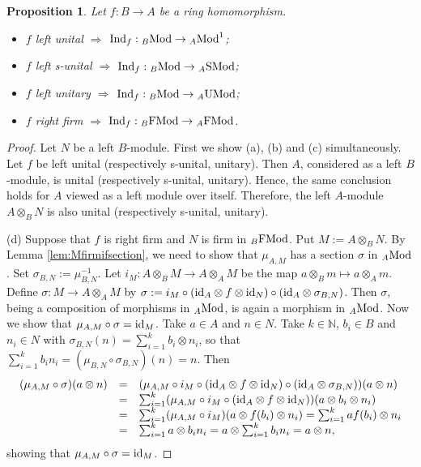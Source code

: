 \documentclass[12pt]{amsart}
\newtheorem{prop}[thm]{Proposition}
\theoremstyle{definition}
\newcommand{\N}{\mathbb{N}}
\newcommand{\Mod}{{\rm Mod}}
\newcommand{\FMod}{{\rm FMod}}
\newcommand{\SMod}{{\rm SMod}}
\newcommand{\UMod}{{\rm UMod}}
\newcommand{\id}{{\rm id}}
\newcommand{\Ind}{{\rm Ind}}
\begin{document}
\begin{prop}
Let $f : B \to A$ be a ring homomorphism. 

\begin{itemize}[widest=(a)]

\item[{\rm (a)}] $f$ left unital
$\Longrightarrow$
$\Ind_f : {}_B \Mod \to {}_A \Mod^1$;

\item[{\rm (b)}] $f$ left s-unital 
$\Longrightarrow$
$\Ind_f : {}_B \Mod \to {}_A \SMod$;

\item[{\rm (c)}] $f$ left unitary 
$\Longrightarrow$
$\Ind_f : {}_B \Mod \to {}_A \UMod$;

\item[{\rm (d)}] $f$ right firm 
$\Longrightarrow$
$\Ind_f : {}_B \FMod \to {}_A \FMod$.

\end{itemize}
\end{prop}

\begin{proof}
Let $N$ be a left $B$-module.
First we show (a), (b) and (c) 
simultaneously. Let $f$ be left
unital (respectively s-unital, unitary). 
Then $A$,
considered as a left $B$-module, is
unital (respectively s-unital, unitary).
Hence, the same conclusion holds for 
$A$ viewed as a left module over itself.
Therefore, the left $A$-module
$A \otimes_B N$ is also unital 
(respectively s-unital, unitary).

(d) Suppose that $f$ is right firm and $N$ 
is firm in ${}_B \FMod$. 
Put $M := A \otimes_B N$.
By Lemma \ref{lem:Mfirmifsection}, 
we need to show that $\mu_{A,M}$ 
has a section $\sigma$ in ${}_A \Mod$. 
Set $\sigma_{B,N} := \mu_{B,N}^{-1}$.
Let $i_M : A \otimes_B M \to A \otimes_A M$ be the 
map $a \otimes_B m \mapsto a \otimes_A m$.
Define $\sigma : M \to A \otimes_A M$ by
$\sigma := i_M \circ (\id_A \otimes f \otimes \id_N) \circ
(\id_A \otimes \sigma_{B,N})$.
Then $\sigma$, being a 
composition of morphisms in ${}_A \Mod$, is 
again a morphism in ${}_A \Mod$.
Now we show that
$\mu_{A,M} \circ \sigma = \id_M$.
Take $a \in A$ and $n \in N$. Take 
$k \in \N$, $b_i \in B$ and $n_i \in N$ 
with $\sigma_{B,N}(n) = \sum_{i=1}^k b_i \otimes n_i$, 
so that $\sum_{i=1}^k b_i n_i = 
(\mu_{B,N} \circ \sigma_{B,N})(n) = n$. Then
\[
\begin{array}{rcl}
(\mu_{A,M} \circ \sigma)( 
 a \otimes n ) 
 &=&  
(\mu_{A,M} \circ i_M \circ 
(\id_A \otimes f \otimes \id_N) \circ 
(\id_A \otimes \sigma_{B,N})) (a \otimes n) 
\\
&=& \sum_{i=1}^k (\mu_{A,M} \circ i_M \circ 
(\id_A \otimes f \otimes \id_N)) (a \otimes b_i \otimes n_i)
\\
&=&
\sum_{i=1}^k (\mu_{A,M} \circ i_M)
( a \otimes f(b_i) \otimes n_i )
= \sum_{i=1}^k  af(b_i) \otimes n_i
\\
&=& \sum_{i=1}^k a \otimes b_i n_i = 
a \otimes \sum_{i=1}^k b_i n_i = a \otimes n,
\end{array}
\]
showing that $\mu_{A,M} \circ \sigma = \id_M$.
\end{proof}
\end{document}
